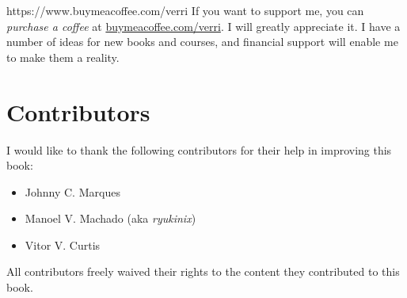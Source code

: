 \vfill

\begin{parwithqr}{https://www.buymeacoffee.com/verri}
  If you want to support me, you can \emph{purchase a coffee} at
  \href{\aurl}{buymeacoffee.com/verri}. I will greatly appreciate it.  I have a number of
  ideas for new books and courses, and financial support will enable me to make them a
  reality.
\end{parwithqr}

\newpage

\section*{Contributors}

I would like to thank the following contributors for their help in improving this book:

\begin{itemize}
  \itemsep0em
  \item Johnny C. Marques
  \item Manoel V. Machado (aka \emph{ryukinix})
  \item Vitor V. Curtis
\end{itemize}

All contributors freely waived their rights to the content they contributed to this book.
